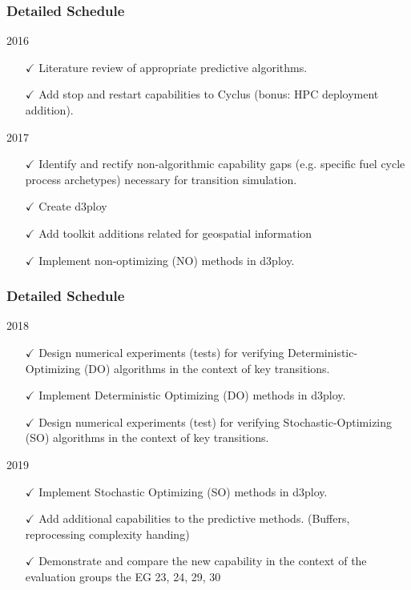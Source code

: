 \begin{frame}
        \frametitle{Detailed Schedule}
\begin{block}{2016}
        \begin{itemize}
       \item[$\checkmark$] Literature review of appropriate predictive algorithms.
       \item[$\checkmark$] Add stop and restart capabilities to Cyclus (bonus: HPC deployment addition).
        \end{itemize}
\end{block}
\begin{block}{2017}
        \begin{itemize}
       \item[$\checkmark$] Identify and rectify non-algorithmic capability gaps (e.g. specific fuel cycle process archetypes) necessary for transition simulation.
       \item[$\checkmark$] Create d3ploy
       \item[$\checkmark$] Add toolkit additions related for geospatial information
       \item[$\checkmark$] Implement non-optimizing (NO) methods in d3ploy.
        \end{itemize}
\end{block}
\end{frame}


\begin{frame}
        \frametitle{Detailed Schedule}
\begin{block}{2018}
        \begin{itemize}
       \item[$\checkmark$] Design numerical experiments (tests) for verifying Deterministic-Optimizing (DO) algorithms in the context of key transitions.
       \item[$\checkmark$] Implement Deterministic Optimizing (DO) methods in d3ploy.
       \item[$\checkmark$] Design numerical experiments (test) for verifying Stochastic-Optimizing (SO) algorithms in the context of key transitions. 
        \end{itemize}
\end{block}
\begin{block}{2019}
        \begin{itemize}
       \item[$\checkmark$] Implement Stochastic Optimizing (SO) methods in d3ploy.
       \item[$\checkmark$] Add additional capabilities to the predictive methods. (Buffers, reprocessing complexity handing)
       \item[$\checkmark$] Demonstrate and compare the new capability in the context of the evaluation groups the EG 23, 24, 29, 30
        \end{itemize}
\end{block}
\end{frame}


